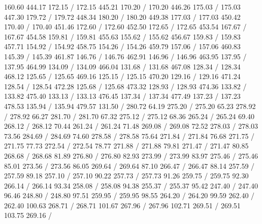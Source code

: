 { 160.60 444.17 172.15 /
 172.15 445.21 170.20 /
 170.20 446.26 175.03 /
 175.03 447.30 179.72 /
 179.72 448.34 180.20 /
 180.20 449.38 177.03 /
 177.03 450.42 170.40 /
 170.40 451.46 172.60 /
 172.60 452.50 172.65 /
 172.65 453.54 167.67 /
 167.67 454.58 159.81 /
 159.81 455.63 155.62 /
 155.62 456.67 159.83 /
 159.83 457.71 154.92 /
 154.92 458.75 154.26 /
 154.26 459.79 157.06 /
 157.06 460.83 145.39 /
 145.39 461.87 146.76 /
 146.76 462.91 146.96 /
 146.96 463.95 137.95 /
 137.95 464.99 134.09 /
 134.09 466.04 131.68 /
 131.68 467.08 128.34 /
 128.34 468.12 125.65 /
 125.65 469.16 125.15 /
 125.15 470.20 129.16 /
 129.16 471.24 128.54 /
 128.54 472.28 125.68 /
 125.68 473.32 128.93 /
 128.93 474.36 133.82 /
 133.82 475.40 133.13 /
 133.13 476.45 137.34 /
 137.34 477.49 137.23 /
 137.23 478.53 135.94 /
 135.94 479.57 131.50 /
\setsolid
{} 280.72 64.19 275.20 /
 275.20 65.23 278.92 /
 278.92 66.27 281.70 /
 281.70 67.32 275.12 /
 275.12 68.36 265.24 /
 265.24 69.40 268.12 /
 268.12 70.44 261.24 /
 261.24 71.48 269.08 /
 269.08 72.52 278.03 /
 278.03 73.56 284.69 /
 284.69 74.60 278.58 /
 278.58 75.64 271.84 /
 271.84 76.68 271.75 /
 271.75 77.73 272.54 /
 272.54 78.77 271.88 /
 271.88 79.81 271.47 /
 271.47 80.85 268.68 /
 268.68 81.89 276.80 /
 276.80 82.93 273.99 /
 273.99 83.97 275.46 /
 275.46 85.01 273.56 /
 273.56 86.05 269.64 /
 269.64 87.10 266.47 /
 266.47 88.14 257.59 /
 257.59 89.18 257.10 /
 257.10 90.22 257.73 /
 257.73 91.26 259.75 /
 259.75 92.30 266.14 /
 266.14 93.34 258.08 /
 258.08 94.38 255.37 /
 255.37 95.42 247.40 /
 247.40 96.46 248.80 /
 248.80 97.51 259.95 /
 259.95 98.55 264.20 /
 264.20 99.59 262.40 /
 262.40 100.63 268.71 /
 268.71 101.67 267.96 /
 267.96 102.71 269.51 /
 269.51 103.75 269.16 /
}
